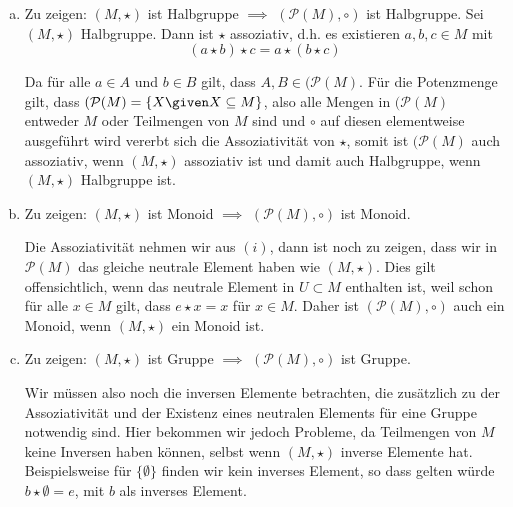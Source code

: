 \begin{enumerate}[a)]
  \item Zu zeigen: $(M, \star)$ ist Halbgruppe $\implies$ $(\mathcal{P}(M), \circ)$ ist Halbgruppe.
  Sei $(M, \star)$ Halbgruppe. Dann ist $\star$ assoziativ, d.h. es existieren $a,b,c \in M$ mit
  \[
    (a \star b) \star c = a \star (b \star c)
  \]

  Da für alle $a \in A$ und $b \in B$ gilt, dass $A, B \in (\mathcal{P}(M)$. Für die Potenzmenge gilt, dass $(\mathcal{P}(M) = \{  X \given X \subseteq M \}$, also alle Mengen in $(\mathcal{P}(M)$ entweder $M$ oder Teilmengen von $M$ sind und $\circ$ auf diesen elementweise ausgeführt wird vererbt sich die Assoziativität von $\star$, somit ist $(\mathcal{P}(M)$ auch assoziativ, wenn $(M, \star)$ assoziativ ist und damit auch Halbgruppe, wenn $(M, \star)$ Halbgruppe ist.

  \item Zu zeigen: $(M, \star)$ ist Monoid $\implies$ $(\mathcal{P}(M), \circ)$ ist Monoid.

  Die Assoziativität nehmen wir aus $(i)$, dann ist noch zu zeigen, dass wir in $\mathcal{P}(M)$ das gleiche neutrale Element haben wie $(M, \star)$. Dies gilt offensichtlich, wenn das neutrale Element in $U \subset M$ enthalten ist, weil schon für alle $x \in M$ gilt, dass $e \star x = x$ für $x \in M$. Daher ist $(\mathcal{P}(M), \circ)$ auch ein Monoid, wenn $(M, \star)$ ein Monoid ist.

  \item Zu zeigen: $(M, \star)$ ist Gruppe $\implies$ $(\mathcal{P}(M), \circ)$ ist Gruppe.

  Wir müssen also noch die inversen Elemente betrachten, die zusätzlich zu der Assoziativität und der Existenz eines neutralen Elements für eine Gruppe notwendig sind. Hier bekommen wir jedoch Probleme, da Teilmengen von $M$ keine Inversen haben können, selbst wenn $(M, \star)$ inverse Elemente hat. Beispielsweise für $  \{\emptyset\}  $ finden wir kein inverses Element, so dass gelten würde $b \star \emptyset = e$, mit $b$ als inverses Element.

\end{enumerate}

